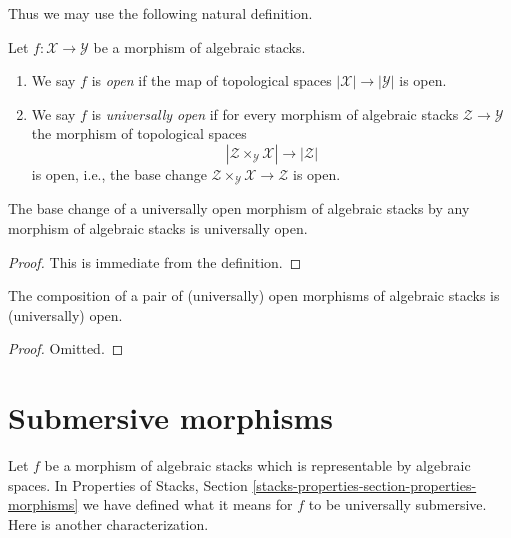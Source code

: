 \noindent
Thus we may use the following natural definition.

\begin{definition}
\label{definition-open}
Let $f : \mathcal{X} \to \mathcal{Y}$ be a morphism of algebraic stacks.
\begin{enumerate}
\item We say $f$ is {\it open} if the map of topological
spaces $|\mathcal{X}| \to |\mathcal{Y}|$ is open.
\item We say $f$ is {\it universally open} if for every morphism
of algebraic stacks $\mathcal{Z} \to \mathcal{Y}$
the morphism of topological spaces
$$
|\mathcal{Z} \times_\mathcal{Y} \mathcal{X}| \to |\mathcal{Z}|
$$
is open, i.e., the base change
$\mathcal{Z} \times_\mathcal{Y} \mathcal{X} \to \mathcal{Z}$ is open.
\end{enumerate}
\end{definition}

\begin{lemma}
\label{lemma-base-change-universally-open}
The base change of a universally open morphism of algebraic stacks
by any morphism of algebraic stacks is universally open.
\end{lemma}

\begin{proof}
This is immediate from the definition.
\end{proof}

\begin{lemma}
\label{lemma-composition-universally-open}
The composition of a pair of (universally) open morphisms of
algebraic stacks is (universally) open.
\end{lemma}

\begin{proof}
Omitted.
\end{proof}







\section{Submersive morphisms}
\label{section-submersive}

\noindent
Let $f$ be a morphism of algebraic stacks which is representable by
algebraic spaces. In
Properties of Stacks, Section
\ref{stacks-properties-section-properties-morphisms}
we have defined what it means for $f$ to be universally submersive.
Here is another characterization.

